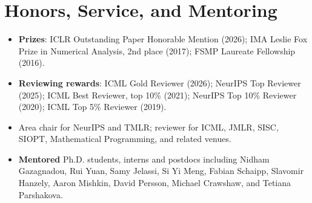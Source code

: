 \documentclass[10pt,letterpaper]{article}
\begin{document}
\section{Honors, Service, and Mentoring}
\begin{itemize}
\item \textbf{Prizes}: ICLR Outstanding Paper Honorable Mention (2026); IMA Leslie Fox Prize in Numerical Analysis, 2nd place (2017); FSMP Laureate Fellowship (2016).
\item \textbf{Reviewing rewards}: ICML Gold Reviewer (2026); NeurIPS Top Reviewer (2025); ICML Best Reviewer, top 10\% (2021); NeurIPS Top 10\% Reviewer (2020); ICML Top 5\% Reviewer (2019).
\item Area chair for NeurIPS and TMLR; reviewer for ICML, JMLR, SISC, SIOPT, Mathematical Programming, and related venues.
\item \textbf{Mentored} Ph.D. students, interns and postdocs including Nidham Gazagnadou, Rui Yuan, Samy Jelassi, Si Yi Meng, Fabian Schaipp, Slavomir Hanzely, Aaron Mishkin, David Persson, Michael Crawshaw, and Tetiana Parshakova.
\end{itemize}
\end{document}
